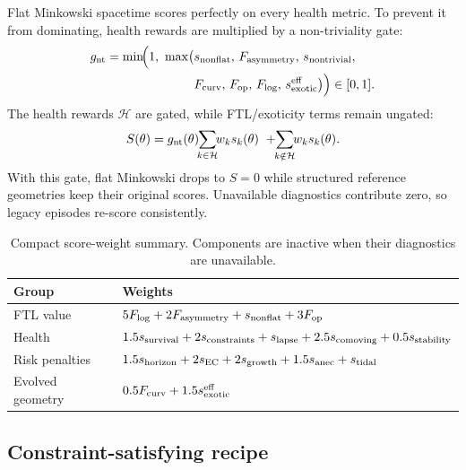\documentclass[twocolumn,floatfix,aps,prd,nofootinbib]{revtex4-2}
\begin{document}
Flat Minkowski spacetime scores perfectly on every health metric.  To prevent it from dominating, health rewards are multiplied by a non-triviality gate:
\begin{equation}
    \begin{aligned}
    g_{\rm nt} = \min\!\Bigl(1,\ \max\bigl(&s_{\rm nonflat},\,F_{\rm asymmetry},\,s_{\rm nontrivial},\\
    &F_{\rm curv},\,F_{\rm op},\,F_{\rm log},\,s_{\rm exotic}^{\rm eff}\bigr)\Bigr)\in[0,1].
    \end{aligned}
\end{equation}
The health rewards $\mathcal{H}$ are gated, while FTL/exoticity terms remain ungated:
\begin{equation}
    S(\theta) = g_{\rm nt}(\theta)\!\!\sum_{k\in\mathcal{H}}\!\! w_k s_k(\theta)\ +\!\!\sum_{k\notin\mathcal{H}}\!\! w_k s_k(\theta).
    \label{eq:gated_score}
\end{equation}
With this gate, flat Minkowski drops to $S=0$ while structured reference geometries keep their original scores.  Unavailable diagnostics contribute zero, so legacy episodes re-score consistently.

\begin{table}[t]
\caption{Compact score-weight summary.  Components are inactive when their diagnostics are unavailable.}
\label{tab:score_weights}
\small
\begin{ruledtabular}
\begin{tabular}{lp{}}
Group & Weights \\
\hline
FTL value & $5F_{\rm log}+2F_{\rm asymmetry}+s_{\rm nonflat}+3F_{\rm op}$ \\
Health & $1.5s_{\rm survival}+2s_{\rm constraints}+s_{\rm lapse}+2.5s_{\rm comoving}+0.5s_{\rm stability}$ \\
Risk penalties & $1.5s_{\rm horizon}+2s_{\rm EC}+2s_{\rm growth}+1.5s_{\rm anec}+s_{\rm tidal}$ \\
Evolved geometry & $0.5F_{\rm curv}+1.5s_{\rm exotic}^{\rm eff}$ \\
\end{tabular}
\end{ruledtabular}
\end{table}

\subsection{Constraint-satisfying recipe}
\end{document}
